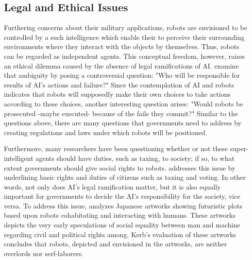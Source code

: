 \documentclass[man]{apa6}
\begin{document}
\subsection{Legal and Ethical Issues}
Furthering concerns about their military applications, robots are envisioned to be controlled by a such intelligence which enable their to perceive their surrounding environments where they interact with the objects by themselves.
Thus, robots can be regarded as independent agents.
This conceptual freedom, however, raises an ethical dilemma caused by the absence of legal ramifications of AI.
 examine that ambiguity by posing a controversial question: "Who will be responsible for results of AI's actions and failure?"
Since the contemplation of AI and robots indicates that robots will supposedly make their own choices to take actions according to these choices, another interesting question arises: "Would robots be prosecuted -maybe executed- because of the fails they commit?"
Similar to the questions above, there are many questions that governments need to address by creating regulations and laws under which robots will be positioned. \par
Furthermore, many researchers have been questioning whether or not these super-intelligent agents should have duties, such as taxing, to society; if so, to what extent governments should give social rights to robots.  addresses this issue by underlining basic rights and duties of citizens such as taxing and voting.
In other words, not only does AI's legal ramification matter, but it is also equally important for governments to decide the AI's responsibility for the society, vice versa.
To address this issue,  analyzes Japanese artworks showing futuristic plots based upon robots cohabitating and interacting with humans.
These artworks depicts the very early speculations of social equality between man and machine regarding civil and political rights among.
Kerb's evaluation of these artworks concludes that robots, depicted and envisioned in the artworks, are neither overlords nor serf-laborers. 
\end{document}
